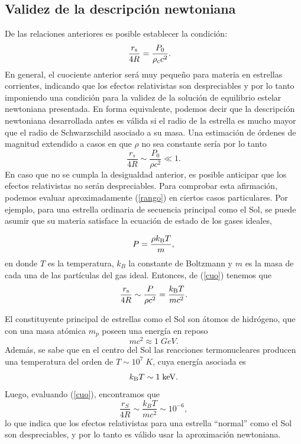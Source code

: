 \subsection{Validez de la descripción newtoniana}

De las relaciones anteriores es posible establecer la condición:
\begin{align}
\frac{r_{\rm s}}{4R}&=\frac{P_0}{\rho_{\rm c} c^2}. \label{rango}
\end{align}
En general, el cuociente anterior será muy pequeño para materia en estrellas corrientes, indicando que los efectos relativistas son despreciables y por lo tanto imponiendo una condición para la validez de la solución de equilibrio estelar newtoniana presentada. En forma equivalente, podemos decir que la descripción newtoniana desarrollada antes es válida si el radio de la estrella es mucho mayor que el radio de Schwarzschild asociado a su masa. Una estimación de órdenes de magnitud extendido a casos en que $\rho$ no sea constante sería por lo tanto
\begin{equation}\label{cuo}
\frac{r_s}{4R}\sim\frac{P_0}{\rho c^2}\ll 1.
\end{equation}
En caso que no se cumpla la desigualdad anterior, es posible anticipar que los efectos relativistas no serán despreciables. Para comprobar esta afirmación, podemos evaluar aproximadamente (\ref{rango})  en ciertos casos particulares. Por ejemplo, para una estrella ordinaria de secuencia principal como el Sol, se puede asumir que su materia satisface la ecuación de estado de los gases ideales,

\begin{equation}
P=\frac{\rho k_{\rm B} T}{m},
\end{equation}
en donde $T$ es la temperatura, $k_B$ la constante de Boltzmann y $m$ es la masa de cada una de las partículas del gas ideal. Entonces, de (\ref{cuo}) tenemos que
\begin{equation}
\frac{r_{\rm s}}{4R}\sim\frac{P}{\rho c^2}=\frac{k_{\rm B}T}{mc^2}.
\end{equation}

El constituyente principal de estrellas como el Sol son átomos de hidrógeno, que con una masa atómica $m_p$ poseen una energía en reposo
\begin{equation}
mc^2\approx1\;GeV.
\end{equation}
Además, se sabe que en el centro del Sol las reacciones termonucleares producen una temperatura del orden de $T\sim 10^7\; K$, cuya energía asociada es
\begin{equation}\label{17}
k_{\rm B}T\sim 1\; {\rm keV}.
\end{equation}
Luego, evaluando (\ref{cuo}), encontramos que
\begin{equation}\label{18}
\frac{r_S}{4R}\sim\frac{k_{B}T}{mc^2}\sim10^{-6},
\end{equation}
lo que indica que los efectos relativistas para una estrella ``normal'' como el Sol son despreciables, y por lo tanto es válido usar la aproximación newtoniana.

